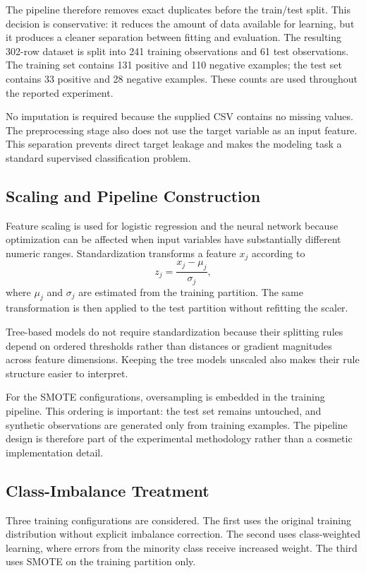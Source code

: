 \documentclass[10pt]{article}
\begin{document}
The pipeline therefore removes exact duplicates before the train/test split. This decision is conservative: it reduces the amount of data available for learning, but it produces a cleaner separation between fitting and evaluation. The resulting 302-row dataset is split into 241 training observations and 61 test observations. The training set contains 131 positive and 110 negative examples; the test set contains 33 positive and 28 negative examples. These counts are used throughout the reported experiment.

No imputation is required because the supplied CSV contains no missing values. The preprocessing stage also does not use the target variable as an input feature. This separation prevents direct target leakage and makes the modeling task a standard supervised classification problem.

\subsection{Scaling and Pipeline Construction}
Feature scaling is used for logistic regression and the neural network because optimization can be affected when input variables have substantially different numeric ranges. Standardization transforms a feature $x_j$ according to
\begin{equation}
z_j=\frac{x_j-\mu_j}{\sigma_j},
\end{equation}
where $\mu_j$ and $\sigma_j$ are estimated from the training partition. The same transformation is then applied to the test partition without refitting the scaler.

Tree-based models do not require standardization because their splitting rules depend on ordered thresholds rather than distances or gradient magnitudes across feature dimensions. Keeping the tree models unscaled also makes their rule structure easier to interpret.

For the SMOTE configurations, oversampling is embedded in the training pipeline. This ordering is important: the test set remains untouched, and synthetic observations are generated only from training examples. The pipeline design is therefore part of the experimental methodology rather than a cosmetic implementation detail.

\subsection{Class-Imbalance Treatment}
Three training configurations are considered. The first uses the original training distribution without explicit imbalance correction. The second uses class-weighted learning, where errors from the minority class receive increased weight. The third uses SMOTE on the training partition only.
\end{document}
